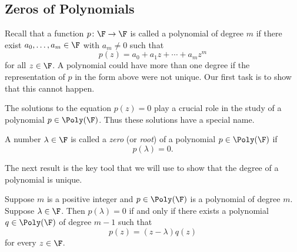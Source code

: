 %

\subsection{Zeros of Polynomials}

Recall that a function $p\colon\F\to\F$ is called a polynomial of degree $m$
if there exist $a_0,\dots,a_m\in\F$ with $a_m\ne0$ such that
\[ p(z) = a_0+a_1z+\cdots+a_mz^m \]
for all $z\in\F$. A polynomial could have more than one degree if the
representation of $p$ in the form above were not unique. Our first task is to
show that this cannot happen.

The solutions to the equation $p(z)=0$ play a crucial role in the study of a
polynomial $p\in\Poly(\F)$. Thus these solutions have a special name.

\begin{definition}\label{ax:4.5}
A number $\lambda\in\F$ is called a \emph{zero} (or \emph{root}) of a
polynomial $p\in\Poly(\F)$ if
\[ p(\lambda)=0. \]
\end{definition}

The next result is the key tool that we will use to show that the degree of a
polynomial is unique.

\begin{result}\label{ax:4.6}
Suppose $m$ is a positive integer and $p\in\Poly(\F)$ is a polynomial of degree
$m$. Suppose $\lambda\in\F$. Then $p(\lambda)=0$ if and only if there exists a
polynomial $q\in\Poly(\F)$ of degree $m-1$ such that
\[ p(z) = (z-\lambda)q(z) \]
for every $z\in\F$.
\end{result}

